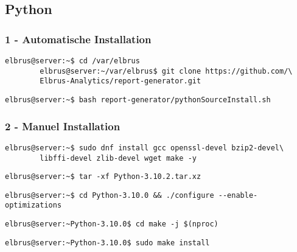 \documentclass{article}
\begin{document}
	\newpage
	\subsection{Python}
	\subsubsection{1 - Automatische Installation}
	\begin{lstlisting}[caption={Kopieren des Github Repositorys 'report-generator'.}]
		elbrus@server:~$ cd /var/elbrus
		elbrus@server:~/var/elbrus$ git clone https://github.com/\
		Elbrus-Analytics/report-generator.git
	\end{lstlisting}

	\begin{lstlisting}[caption={Ausführen des 'pythonSourceInstall.sh' Scripts.}]
		elbrus@server:~$ bash report-generator/pythonSourceInstall.sh
	\end{lstlisting}
	
	\subsubsection{2 - Manuel Installation}
	\begin{lstlisting}[caption={Installieren von benötigten Packeten und Abhängigkeiten.}]
		elbrus@server:~$ sudo dnf install gcc openssl-devel bzip2-devel\
		libffi-devel zlib-devel wget make -y
	\end{lstlisting}
	
	\begin{lstlisting}[caption={Extrahieren der installierent Dateien.}]
		elbrus@server:~$ tar -xf Python-3.10.2.tar.xz
	\end{lstlisting}
	
	\begin{lstlisting}[caption={Wechseln zu source Verzeichniss. Und ausführen des Konfigurations Scripts.}]
		elbrus@server:~$ cd Python-3.10.0 && ./configure --enable-optimizations
	\end{lstlisting}

	\begin{lstlisting}[caption={Starten des build Prozesses.}]
		elbrus@server:~Python-3.10.0$ cd make -j $(nproc)
	\end{lstlisting}
	
	\begin{lstlisting}[caption={Installieren von Python.}]
		elbrus@server:~Python-3.10.0$ sudo make install
	\end{lstlisting}
	
\end{document}
